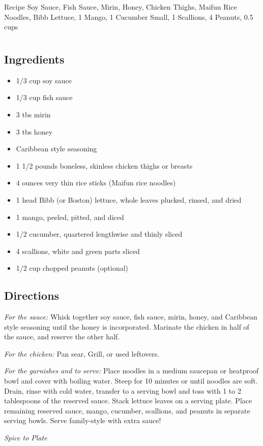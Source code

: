 Recipe
  Soy Sauce, 
  Fish Sauce, 
  Mirin, 
  Honey, 
  Chicken Thighs, 
  Maifun Rice Noodles, 
  Bibb Lettuce, 1
  Mango, 1
  Cucumber Small, 1
  Scallions, 4
  Peanuts, 0.5 cups

\section{ }

\subsection{ Ingredients }

\begin{itemize}
  \item 1/3 cup soy sauce
  \item 1/3 cup fish sauce
  \item 3 tbs mirin
  \item 3 tbs honey
  \item Caribbean style seasoning
  \item 1 1/2 pounds boneless, skinless chicken thighs or breasts
  \item 4 ounces very thin rice sticks (Maifun rice noodles)
  \item 1 head Bibb (or Boston) lettuce, whole leaves plucked, rinsed, and dried
  \item 1 mango, peeled, pitted, and diced
  \item 1/2 cucumber, quartered lengthwise and thinly sliced
  \item 4 scallions, white and green parts sliced
  \item 1/2 cup chopped peanuts (optional)
\end{itemize}

\subsection{ Directions }

  \textit{For the sauce:} Whisk together soy sauce, fish sauce, mirin, honey, and Caribbean style seasoning until the honey is incorporated. Marinate the chicken in half of the sauce, and reserve the other half. 

  \textit{For the chicken:} Pan sear, Grill, or used leftovers.

  \textit{For the garnishes and to serve:} Place noodles in a medium saucepan or heatproof bowl and cover with boiling water. Steep for 10 minutes or until noodles are soft. Drain, rinse with cold water, transfer to a serving bowl and toss with 1 to 2 tablespoons of the reserved sauce. Stack lettuce leaves on a serving plate. Place remaining reserved sauce, mango, cucumber, scallions, and peanuts in separate serving bowls. Serve family-style with extra sauce!

\textit{Spice to Plate}

